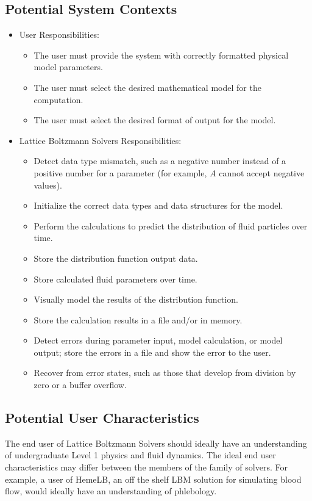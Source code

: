 \documentclass[12pt]{article}
\newcommand{\famname}{Lattice Boltzmann Solvers} %
\begin{document}
\subsection{Potential System Contexts}

\begin{itemize}
\item User Responsibilities:
\begin{itemize}
\item The user must provide the system with correctly formatted physical model parameters.
\item The user must select the desired mathematical model for the computation.
\item The user must select the desired format of output for the model.
\end{itemize}
\item \famname{} Responsibilities:
\begin{itemize}
\item Detect data type mismatch, such as a negative number instead of a positive number for a parameter (for example, $A$ cannot accept negative values).
\item Initialize the correct data types and data structures for the model.
\item Perform the calculations to predict the distribution of fluid particles over time.
\item Store the distribution function output data.
\item Store calculated fluid parameters over time.
\item Visually model the results of the distribution function.
\item Store the calculation results in a file and/or in memory.
\item Detect errors during parameter input, model calculation, or model output; store the errors in a file and show the error to the user.
\item Recover from error states, such as those that develop from division by zero or a buffer overflow.
\end{itemize}
\end{itemize}

\subsection{Potential User Characteristics} \label{SecUserCharacteristics}

The end user of \famname{} should ideally have an understanding of undergraduate Level 1 physics and fluid dynamics. The ideal end user characteristics may differ between the members of the family of solvers. For example, a user of HemeLB, an off the shelf LBM solution for simulating blood flow, would ideally have an understanding of phlebology.
\end{document}
